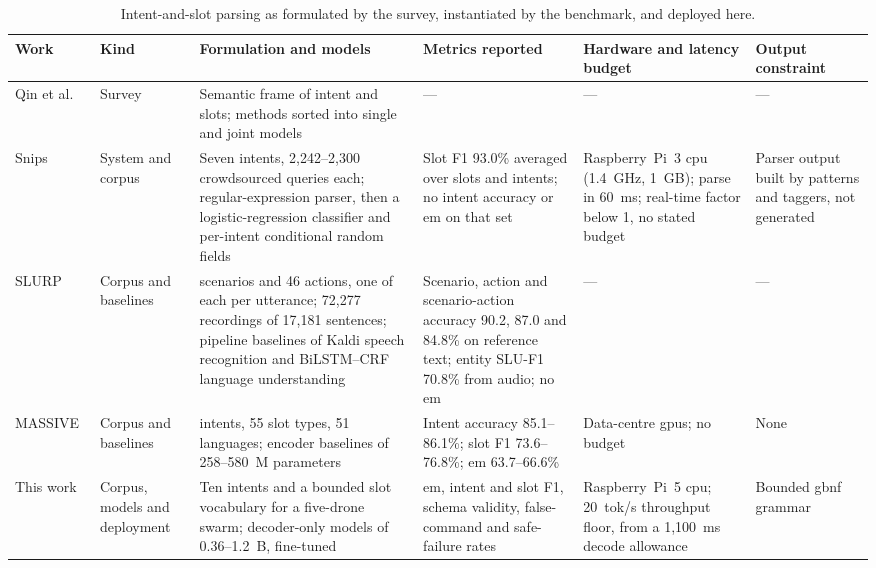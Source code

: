 \begin{table}[htbp]
\centering
\footnotesize
\caption[Intent-and-slot parsing: formulation, benchmark and this work]{Intent-and-slot parsing
as formulated by the survey, instantiated by the benchmark, and deployed here.}
\label{tab:soa-slu}
\begin{tabularx}{\textwidth}{@{}>{\raggedright\arraybackslash}p{2.4cm} >{\raggedright\arraybackslash}p{1.6cm} >{\raggedright\arraybackslash}X >{\raggedright\arraybackslash}X >{\raggedright\arraybackslash}p{2.4cm} >{\raggedright\arraybackslash}p{1.7cm}@{}}
\toprule
Work & Kind & Formulation and models & Metrics reported & Hardware and latency budget & Output constraint \\
\midrule
Qin et al.~\cite{qin2021} & Survey & Semantic frame of intent and slots; methods sorted into single and joint models & --- & --- & --- \\
Snips~\cite{snips2018} & System and corpus & Seven intents, 2{,}242--2{,}300 crowdsourced queries each; regular-expression parser, then a logistic-regression classifier and per-intent conditional random fields & Slot F1 93.0\% averaged over slots and intents; no intent accuracy or \gls{em} on that set & Raspberry~Pi~3 \gls{cpu} (1.4~GHz, 1~GB); parse in 60~ms; real-time factor below 1, no stated budget & Parser output built by patterns and taggers, not generated \\
SLURP~\cite{slurp2020} & Corpus and baselines & 18 scenarios and 46 actions, one of each per utterance; 72{,}277 recordings of 17{,}181 sentences; pipeline baselines of Kaldi speech recognition and BiLSTM--CRF language understanding & Scenario, action and scenario-action accuracy 90.2, 87.0 and 84.8\% on reference text; entity SLU-F1 70.8\% from audio; no \gls{em} & --- & --- \\
MASSIVE~\cite{massive} & Corpus and baselines & 60 intents, 55 slot types, 51 languages; encoder baselines of 258--580~M parameters & Intent accuracy 85.1--86.1\%; slot F1 73.6--76.8\%; \gls{em} 63.7--66.6\% & Data-centre \glspl{gpu}; no budget & None \\
\midrule
This work & Corpus, models and deployment & Ten intents and a bounded slot vocabulary for a five-drone swarm; decoder-only models of 0.36--1.2~B, fine-tuned & \gls{em}, intent and slot F1, schema validity, false-command and safe-failure rates & Raspberry~Pi~5 \gls{cpu}; 20~tok/s throughput floor, from a 1{,}100~ms decode allowance & Bounded \gls{gbnf} grammar \\
\bottomrule
\end{tabularx}
\end{table}

